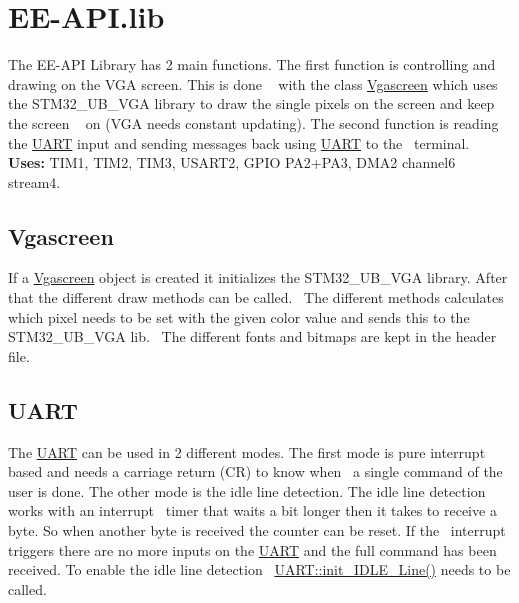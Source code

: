 \hypertarget{_e_e-_a_p_i_8lib_library_sec}{}\section{E\+E-\/\+A\+P\+I.\+lib}\label{_e_e-_a_p_i_8lib_library_sec}
The E\+E-\/\+A\+PI Library has 2 main functions. The first function is controlling and drawing on the V\+GA screen. This is done ~\newline
 with the class \mbox{\hyperlink{class_vgascreen}{Vgascreen}} which uses the S\+T\+M32\+\_\+\+U\+B\+\_\+\+V\+GA library to draw the single pixels on the screen and keep the screen ~\newline
 on (V\+GA needs constant updating). The second function is reading the \mbox{\hyperlink{namespace_u_a_r_t}{U\+A\+RT}} input and sending messages back using \mbox{\hyperlink{namespace_u_a_r_t}{U\+A\+RT}} to the~\newline
 terminal.~\newline
 {\bfseries Uses\+:} T\+I\+M1, T\+I\+M2, T\+I\+M3, U\+S\+A\+R\+T2, G\+P\+IO P\+A2+\+P\+A3, D\+M\+A2 channel6 stream4.~\newline
 ~\newline
 \hypertarget{_e_e-_a_p_i_8lib_vga_sec}{}\subsection{Vgascreen}\label{_e_e-_a_p_i_8lib_vga_sec}
If a \mbox{\hyperlink{class_vgascreen}{Vgascreen}} object is created it initializes the S\+T\+M32\+\_\+\+U\+B\+\_\+\+V\+GA library. After that the different draw methods can be called.~\newline
 The different methods calculates which pixel needs to be set with the given color value and sends this to the S\+T\+M32\+\_\+\+U\+B\+\_\+\+V\+GA lib.~\newline
 The different fonts and bitmaps are kept in the header file.~\newline
 ~\newline
 \hypertarget{_e_e-_a_p_i_8lib_uart2_sec}{}\subsection{U\+A\+RT}\label{_e_e-_a_p_i_8lib_uart2_sec}
The \mbox{\hyperlink{namespace_u_a_r_t}{U\+A\+RT}} can be used in 2 different modes. The first mode is pure interrupt based and needs a carriage return (CR) to know when~\newline
 a single command of the user is done. The other mode is the idle line detection. The idle line detection works with an interrupt~\newline
 timer that waits a bit longer then it takes to receive a byte. So when another byte is received the counter can be reset. If the~\newline
 interrupt triggers there are no more inputs on the \mbox{\hyperlink{namespace_u_a_r_t}{U\+A\+RT}} and the full command has been received. To enable the idle line detection~\newline
 \mbox{\hyperlink{namespace_u_a_r_t_aae0befbeb6fc7e852f7a200e9a9f4c7c}{U\+A\+R\+T\+::init\+\_\+\+I\+D\+L\+E\+\_\+\+Line()}} needs to be called.~\newline
 ~\newline
 